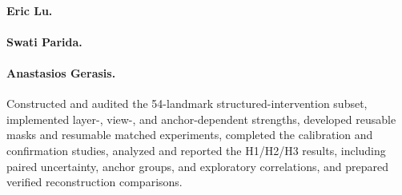 \paragraph{Eric Lu.}
\mbox{}\par\vspace{0.4cm}
\paragraph{Swati Parida.}
\mbox{}\par\vspace{0.4cm}
\paragraph{Anastasios Gerasis.}
Constructed and audited the 54-landmark structured-intervention subset, implemented layer-, view-, and anchor-dependent strengths, developed reusable masks and resumable matched experiments, completed the calibration and confirmation studies, analyzed and reported the H1/H2/H3 results, including paired uncertainty, anchor groups, and exploratory correlations, and prepared verified reconstruction comparisons.
